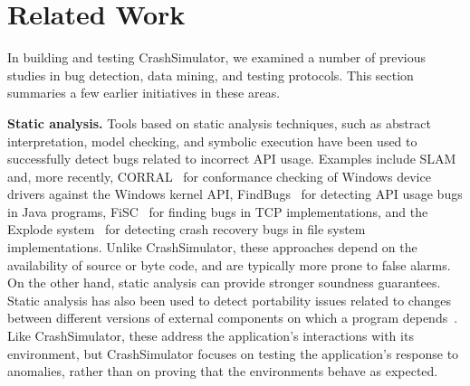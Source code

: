 \section{Related Work} \label{sec:relatedwork}
In building and testing CrashSimulator, we
examined a number of previous studies in bug detection, data mining, and
testing protocols. This section summaries a few earlier initiatives in these areas.

\iffalse
While there is a vast literature on test
generation~\cite{ammann2008introduction, mcminn2004search,
  puasuareanu2009survey, dias2007survey}, much less work
has focused on issues of portability and testing whether software
behaves consistently in different environments.  Prior work on
CheckAPI~\cite{rasley2015detecting} and
NetCheck~\cite{Zhuang_NSDI_2014} begins to fill this gap and this paper
builds upon those results.
%
%


Crash reproduction by test case mutation~\cite{DBLP:conf/sigsoft/XuanXM15}.

\fi


\noindent
{\bf Static analysis. }
Tools based on static analysis techniques, such as abstract
interpretation, model checking, and symbolic execution have been used
to successfully detect bugs related to incorrect API usage. Examples
include SLAM~\cite{Ball_adecade, Ball:2002:SLP:503272.503274} and,
more recently, CORRAL~\cite{DBLP:conf/sigsoft/LalQ14} for conformance
checking of Windows device drivers against the Windows kernel API,
FindBugs~\cite{DBLP:conf/oopsla/HovemeyerP04} for detecting API usage
bugs in Java programs, FiSC~\cite{Musuvathi04modelchecking} for
finding bugs in TCP implementations, and the Explode
system~\cite{Yang:2006:ELG:1298455.1298469} for detecting crash
recovery bugs in file system implementations. Unlike CrashSimulator,
these approaches depend on the availability of source or byte code, and
are typically more prone to false alarms. On the other hand, static
analysis can provide stronger soundness guarantees.  Static analysis
has also been used to detect portability issues related to changes
between different versions of external components on which a program
depends~\cite{silakov2010improving, javacompliance-www}. Like
CrashSimulator, these address the application's interactions with its
environment, but CrashSimulator focuses on testing the application's
response to anomalies, rather than on proving that the environments
behave as expected.

